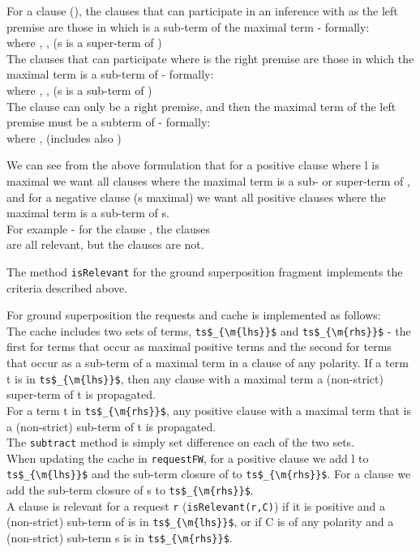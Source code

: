 For a clause  (), the clauses that can participate in an inference with  as the left premise are those in which  is a sub-term of the maximal term - formally:\\
 where , ,   (s is a super-term of )\\
The clauses that can participate where  is the right premise are those in which the maximal term is a sub-term of  - formally:\\
 where , ,     (s is a sub-term of )\\
The clause  can only be a right  premise, and then the maximal term of the left premise must be a subterm of  - formally:\\
 where ,  (includes also )

We can see from the above formulation that for a positive clause  where l is maximal we want all clauses where the maximal term is a sub- or super-term of , and for a negative clause  (s maximal) we want all positive clauses where the maximal term is a sub-term of s.\\
For example - for the clause , the clauses \\
 are all relevant, 
but the clauses  are not.

The method \lstinline|isRelevant| for the ground superposition fragment implements the criteria described above.

For ground superposition the requests and cache is implemented as follows:\\
The cache includes two sets of terms, \lstinline|ts$_{\m{lhs}}$| and \lstinline|ts$_{\m{rhs}}$| - the first for terms that occur as maximal positive terms and the second for terms that occur as a sub-term of a maximal term in a clause of any polarity.
If a term t is in \lstinline|ts$_{\m{lhs}}$|, then any clause with a maximal term a (non-strict) super-term of t is propagated.\\
For a term t in \lstinline|ts$_{\m{rhs}}$|, any positive clause with a maximal term that is a (non-strict) sub-term of t is propagated.\\
The \lstinline|subtract| method is simply set difference on each of the two sets.\\
When updating the cache in \lstinline|requestFW|, for a positive clause  we add l to \lstinline|ts$_{\m{lhs}}$| and the sub-term closure of  to \lstinline|ts$_{\m{rhs}}$|. For a clause  we add the sub-term closure of s to \lstinline|ts$_{\m{rhs}}$|.\\
A clause  is relevant for a request \lstinline|r| (\lstinline|isRelevant(r,C)|) if it is positive and a (non-strict) sub-term of  is in \lstinline|ts$_{\m{lhs}}$|, or if C is of any polarity and a (non-strict) sub-term s is in \lstinline|ts$_{\m{rhs}}$|.

